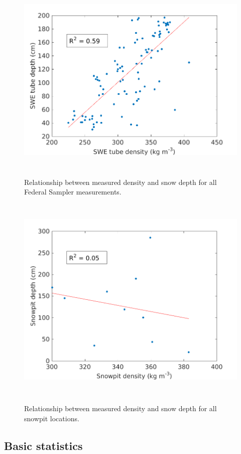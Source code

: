 \documentclass[12pt]{article}
\begin{document}
\begin{figure}[p]
	\centering
	\includegraphics[height = 10cm]{DepthDensity_SWEtube.png}\\
	\caption{Relationship between measured density and snow depth for all Federal Sampler measurements.}
	\label{fig:tube_depth}

	\includegraphics[height = 10cm]{DepthDensity_SP.png}\\
	\caption{Relationship between measured density and snow depth for all snowpit locations.}
	\label{fig:pit_depth}
\end{figure}

\subsection*{Basic statistics}
\end{document}
